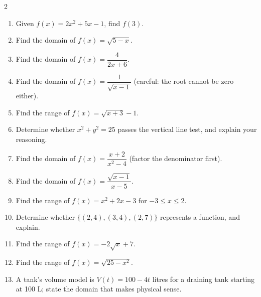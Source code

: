 \documentclass[11pt]{article}
\begin{document}
\clearpage
{}

\begin{recapbox}
\begin{multicols}{2}
\small
\begin{enumerate}[leftmargin=*,itemsep=3pt]
  \item Given $f(x)=2x^2+5x-1$, find $f(3)$.
  \item Find the domain of $f(x)=\sqrt{5-x}$.
  \item Find the domain of $f(x)=\dfrac{4}{2x+6}$.
  \item Find the domain of $f(x)=\dfrac{1}{\sqrt{x-1}}$ (careful: the root cannot be zero either).
  \item Find the range of $f(x)=\sqrt{x+3}-1$.
  \item Determine whether $x^2+y^2=25$ passes the vertical line test, and explain your reasoning.
  \item Find the domain of $f(x)=\dfrac{x+2}{x^2-4}$ (factor the denominator first).
  \item Find the domain of $f(x)=\dfrac{\sqrt{x-1}}{x-5}$.
  \item Find the range of $f(x)=x^2+2x-3$ for $-3\leq x\leq2$.
  \item Determine whether $\{(2,4),(3,4),(2,7)\}$ represents a function, and explain.
  \item Find the range of $f(x)=-2\sqrt{x}+7$.
  \item Find the range of $f(x)=\sqrt{25-x^2}$.
  \item A tank's volume model is $V(t)=100-4t$ litres for a draining tank starting at 100 L; state the domain that makes physical sense.
\end{enumerate}
\end{multicols}
\end{recapbox}
\end{document}
